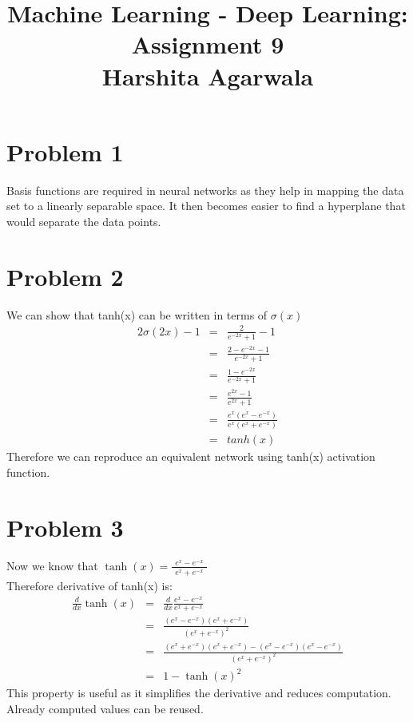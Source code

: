 \documentclass[10pt, a4paper, fleqn]{article}
\begin{document}
\title{Machine Learning - Deep Learning: Assignment 9\\
Harshita Agarwala}
\maketitle
\section{Problem 1}
Basis functions are required in neural networks as they help in mapping the data set to a linearly separable space. It then becomes easier to find a hyperplane that would separate the data points.
\section{Problem 2}
We can show that tanh(x) can be written in terms of $\sigma(x)$
\begin{eqnarray*}
2\sigma(2x) -1 & = & \frac{2}{e^\text{$-2x$}+1} -1\\
&=& \frac{2- e^\text{$-2x$} -1}{e^\text{$-2x$}+1}\\
& = & \frac{1- e^\text{$-2x$}}{e^\text{$-2x$}+1}\\
& = & \frac{e^\text{$2x$} -1}{e^\text{$2x$}+1}\\
& = & \frac{e^x (e^x-e^\text{$-x$})}{e^x(e^x+ e^\text{$-x$})}\\
& = & tanh(x)
\end{eqnarray*}
Therefore we can reproduce an equivalent network using tanh(x) activation function.
\section{Problem 3}
Now we know that $\tanh (x)=\frac{e^x - e^\text{$-x$}}{\substack{e^x + e^\text{$-x$}}}$\\
Therefore derivative of tanh(x) is:
\begin{eqnarray*}
\frac{d}{dx}\tanh (x)&=& \frac{d}{dx}\frac{e^x - e^\text{$-x$}}{e^x + e^\text{$-x$}}\\
&=& \frac{(e^x - e^\text{$-x$})(e^x + e^\text{$-x$})}{(e^x + e^\text{$-x$})^2}\\
&=& \frac{(e^x + e^\text{$-x$})(e^x + e^\text{$-x$}) - (e^x - e^\text{$-x$})(e^x - e^\text{$-x$})}{(e^x + e^\text{$-x$})^2}\\
&=& 1- \tanh(x)^2
\end{eqnarray*}
This property is useful as it simplifies the derivative and reduces computation. Already computed values can be reused.
\end{document}
